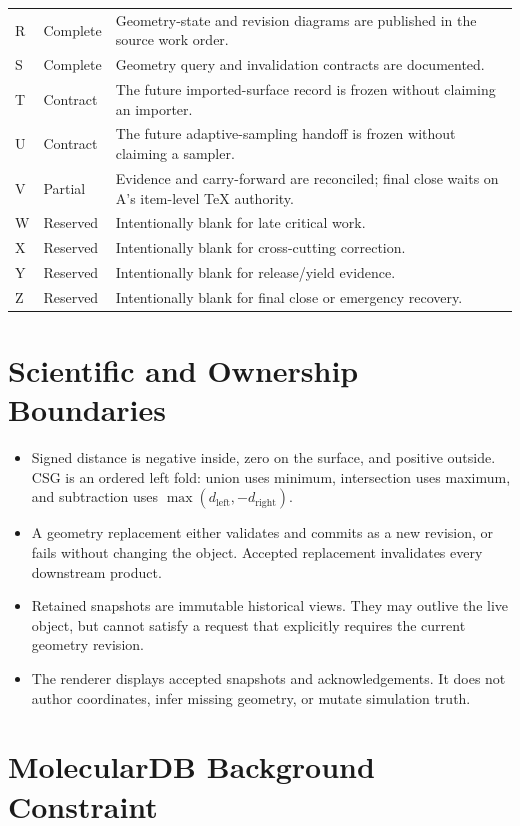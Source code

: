 \documentclass[10pt]{article}
\begin{document}
\begin{tabularx}{\textwidth}{@{}l l X@{}}
R & Complete & Geometry-state and revision diagrams are published in the source work order. \\
S & Complete & Geometry query and invalidation contracts are documented. \\
T & Contract & The future imported-surface record is frozen without claiming an importer. \\
U & Contract & The future adaptive-sampling handoff is frozen without claiming a sampler. \\
V & Partial & Evidence and carry-forward are reconciled; final close waits on A's item-level TeX authority. \\
W & Reserved & Intentionally blank for late critical work. \\
X & Reserved & Intentionally blank for cross-cutting correction. \\
Y & Reserved & Intentionally blank for release/yield evidence. \\
Z & Reserved & Intentionally blank for final close or emergency recovery. \\
\bottomrule
\end{tabularx}
\normalsize

\section*{Scientific and Ownership Boundaries}

\begin{itemize}
  \item Signed distance is negative inside, zero on the surface, and positive
        outside. CSG is an ordered left fold: union uses minimum, intersection
        uses maximum, and subtraction uses
        \(\max(d_{\mathrm{left}},-d_{\mathrm{right}})\).
  \item A geometry replacement either validates and commits as a new revision,
        or fails without changing the object. Accepted replacement invalidates
        every downstream product.
  \item Retained snapshots are immutable historical views. They may outlive the
        live object, but cannot satisfy a request that explicitly requires the
        current geometry revision.
  \item The renderer displays accepted snapshots and acknowledgements. It does
        not author coordinates, infer missing geometry, or mutate simulation
        truth.
\end{itemize}

\section*{MolecularDB Background Constraint}
\end{document}
